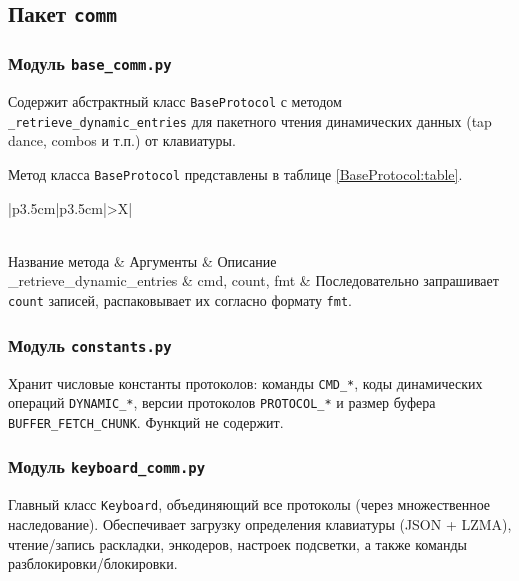 \subsection{Пакет \texttt{comm}}

\subsubsection{Модуль \texttt{base\_comm.py}}

Содержит абстрактный класс \texttt{BaseProtocol} с методом \texttt{\_retrieve\_dynamic\_entries} для пакетного чтения динамических данных (tap dance, combos и т.п.) от клавиатуры.

Метод класса \texttt{BaseProtocol} представлены в таблице \ref{BaseProtocol:table}.

\begin{xltabular}{\textwidth}{|p{3.5cm}|p{3.5cm}|>{\setlength{\baselineskip}{0.7\baselineskip}}X|}
	\caption{Метод класса \texttt{BaseProtocol}\label{BaseProtocol:table}}\\
	\hline \centrow Название метода & \centrow Аргументы & \centrow Описание \\
	\hline
	\finishhead
	\_retrieve\_\newline dynamic\_\newline entries & cmd, count, fmt & Последовательно запрашивает \texttt{count} записей, распаковывает их согласно формату \texttt{fmt}. \\
	\hline
\end{xltabular}

\subsubsection{Модуль \texttt{constants.py}}

Хранит числовые константы протоколов: команды \texttt{CMD\_*}, коды динамических операций \texttt{DYNAMIC\_*}, версии протоколов \texttt{PROTOCOL\_*} и размер буфера \texttt{BUFFER\_FETCH\_CHUNK}. Функций не содержит.

\subsubsection{Модуль \texttt{keyboard\_comm.py}}

Главный класс \texttt{Keyboard}, объединяющий все протоколы (через множественное наследование). Обеспечивает загрузку определения клавиатуры (JSON + LZMA), чтение/запись раскладки, энкодеров, настроек подсветки, а также команды разблокировки/блокировки.


